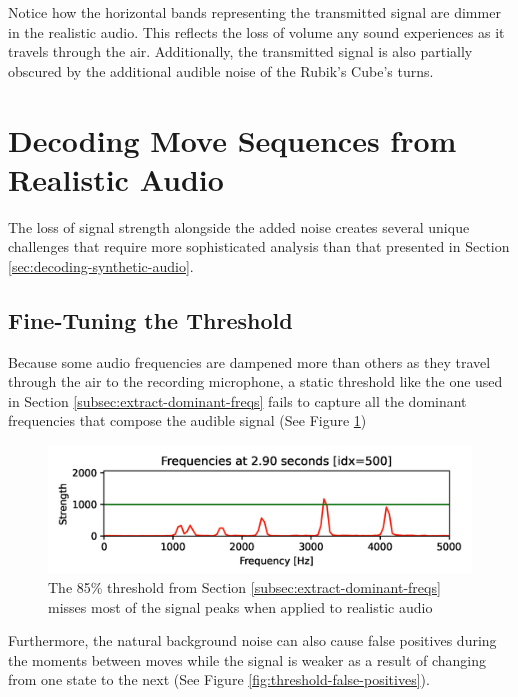 Notice how the horizontal bands representing the transmitted signal are dimmer in the realistic audio.
This reflects the loss of volume any sound experiences as it travels through the air.
Additionally, the transmitted signal is also partially obscured by the additional audible noise of the Rubik's Cube's turns.

\section{Decoding Move Sequences from Realistic Audio}
\label{sec:decoding-realistic-noise}
The loss of signal strength alongside the added noise creates several unique challenges that require more sophisticated analysis than that presented in Section \ref{sec:decoding-synthetic-audio}.

\subsection{Fine-Tuning the Threshold}
\label{subsec:fine-tuning-threshold}
Because some audio frequencies are dampened more than others as they travel through the air to the recording microphone, a static threshold like the one used in Section \ref{subsec:extract-dominant-freqs} fails to capture all the dominant frequencies that compose the audible signal (See Figure \ref{fig:threshold-miss})

\begin{figure}[h]
    \centering
    \includegraphics[width=0.8\linewidth]{Figures/5 Algorithm Design/threshold-miss.png}
    \caption{The 85\% threshold from Section \ref{subsec:extract-dominant-freqs} misses most of the signal peaks when applied to realistic audio}
    \label{fig:threshold-miss}
\end{figure}

Furthermore, the natural background noise can also cause false positives during the moments between moves while the signal is weaker as a result of changing from one state to the next (See Figure \ref{fig:threshold-false-positives}).

